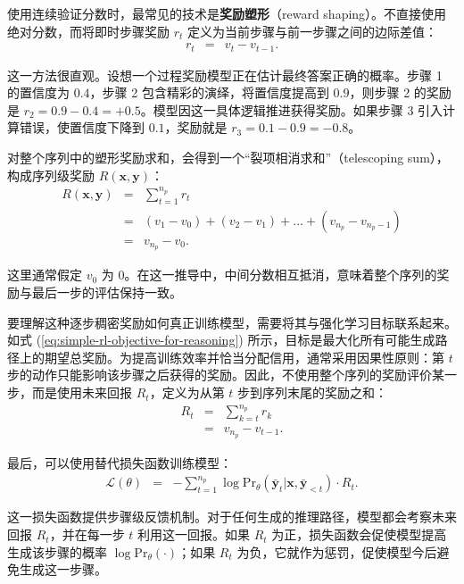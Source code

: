 使用连续验证分数时，最常见的技术是\textbf{奖励塑形}（reward shaping）。不直接使用绝对分数，而将即时步骤奖励 $r_t$ 定义为当前步骤与前一步骤之间的边际差值：
\begin{eqnarray}
r_t & = & v_t - v_{t-1}.
\end{eqnarray}

这一方法很直观。设想一个过程奖励模型正在估计最终答案正确的概率。步骤 1 的置信度为 $0.4$，步骤 2 包含精彩的演绎，将置信度提高到 $0.9$，则步骤 2 的奖励是 $r_2 = 0.9 - 0.4 = +0.5$。模型因这一具体逻辑推进获得奖励。如果步骤 3 引入计算错误，使置信度下降到 $0.1$，奖励就是 $r_3 = 0.1 - 0.9 = -0.8$。

对整个序列中的塑形奖励求和，会得到一个“裂项相消求和”（telescoping sum），构成序列级奖励 $R(\mathbf{x}, \mathbf{y})$：
\begin{eqnarray}
R(\mathbf{x}, \mathbf{y}) & = & \sum_{t=1}^{n_p} r_t \nonumber \\
& = & (v_1 - v_0) + (v_2 - v_1) + \dots + (v_{n_p} - v_{n_p-1}) \nonumber \\
& = & v_{n_p} - v_0.
\end{eqnarray}

\noindent 这里通常假定 $v_0$ 为 0。在这一推导中，中间分数相互抵消，意味着整个序列的奖励与最后一步的评估保持一致。

要理解这种逐步稠密奖励如何真正训练模型，需要将其与强化学习目标联系起来。如式 (\ref{eq:simple-rl-objective-for-reasoning}) 所示，目标是最大化所有可能生成路径上的期望总奖励。为提高训练效率并恰当分配信用，通常采用因果性原则：第 $t$ 步的动作只能影响该步骤之后获得的奖励。因此，不使用整个序列的奖励评价某一步，而是使用未来回报 $R_t$，定义为从第 $t$ 步到序列末尾的奖励之和：
\begin{eqnarray}
R_t & = & \sum_{k=t}^{n_p} r_k \nonumber \\
& = & v_{n_p} - v_{t-1}.
\end{eqnarray}

最后，可以使用替代损失函数训练模型：
\begin{eqnarray}
\mathcal{L}(\theta) & = & - \sum_{t=1}^{n_p} \log \mathrm{Pr}_{\theta}(\bar{\mathbf{y}}_t | \mathbf{x}, \bar{\mathbf{y}}_{<t}) \cdot R_t.
\end{eqnarray}

这一损失函数提供步骤级反馈机制。对于任何生成的推理路径，模型都会考察未来回报 $R_t$，并在每一步 $t$ 利用这一回报。如果 $R_t$ 为正，损失函数会促使模型提高生成该步骤的概率 $\log \mathrm{Pr}_\theta(\cdot)$；如果 $R_t$ 为负，它就作为惩罚，促使模型今后避免生成这一步骤。


